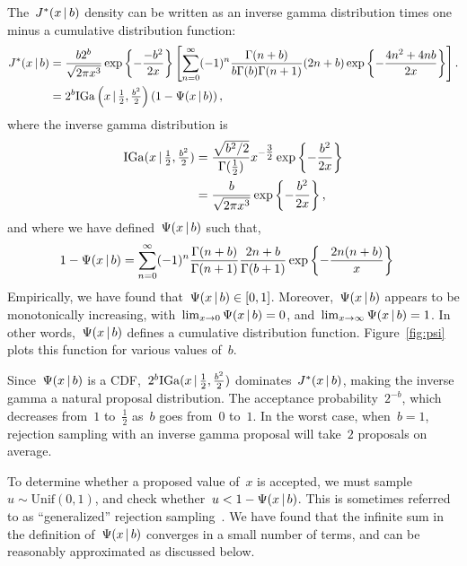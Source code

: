 \documentclass[aos,preprint]{imsart}
\renewcommand{\cite}[1]{\citep{#1}}
\begin{document}
The~$J^{*}(x \,|\, b)$ density can be written as an inverse 
gamma distribution times one minus a cumulative distribution function:
\begin{align}
  \distJacobi(x \given b) &= \frac{b 2^b}{\sqrt{2\pi x^3}} 
      \exp \left \{ -\frac{-b^2}{2x} \right \}
      \left[\sum_{n=0}^\infty (-1)^n \frac{\Gamma(n+b)}{b \Gamma(b) \Gamma(n+1)} (2n+b)
            \exp\left\{- \frac{4n^2 +4nb}{2x} \right\} \right]. \\
  &= 2^b \distInvGamma \left(x \given \tfrac{1}{2}, \tfrac{b^2}{2} \right) \left( 1 - \Psi(x \given b) \right),
\end{align}
where the inverse gamma distribution is
\begin{align}
  \distInvGamma(x \given \tfrac{1}{2}, \tfrac{b^2}{2})
  &= \frac{\sqrt{b^2/2}}{\Gamma(\tfrac{1}{2})} x^{-\tfrac{3}{2}} \exp\left\{-\frac{b^2}{2x} \right\} \\
  &= \frac{b}{\sqrt{2 \pi x^3}} \exp\left\{-\frac{b^2}{2x} \right\},
\end{align}
and where we have defined~$\Psi(x \,|\, b)$ such that,
\begin{align}
1-\Psi(x \given b) &=
    \sum_{n=0}^\infty (-1)^n \frac{\Gamma(n+b)}{\Gamma(n+1)} \frac{2n+b}{\Gamma(b+1)}
    \exp\left\{- \frac{2n(n+b)}{x} \right\}  
\end{align}
Empirically, we have found that~$\Psi(x \,|\, b) \in [0,1]$. Moreover,~$\Psi(x \,|\, b)$ appears to be monotonically increasing, with~$\lim_{x \to 0} \Psi(x \,|\, b) = 0$, and~$\lim_{x \to \infty} \Psi(x \,|\, b) = 1$. In other words,~$\Psi(x \,|\, b)$ defines a cumulative distribution function. Figure~\ref{fig:psi} plots this function for various values of~$b$. 

Since~$\Psi(x \,|\, b)$ is a
CDF,~$2^b \mathrm{IGa}(x \,|\, \tfrac{1}{2}, \tfrac{b^2}{2})$
dominates~$J^{*}(x \,|\, b)$, making the inverse gamma a
natural proposal distribution.  The acceptance probability~$2^{-b}$,
which decreases from~$1$ to~$\tfrac{1}{2}$ as~$b$ goes from~$0$
to~$1$. In the worst case, when~$b=1$, rejection sampling with an
inverse gamma proposal will take~$2$ proposals on average.

To determine whether a proposed value of~$x$ is accepted, we must
sample~$u \sim \mathrm{Unif}(0,1)$, and check
whether~$u < 1-\Psi(x \,|\, b)$. This is sometimes referred to as
``generalized'' rejection sampling~\cite{devroye1986}.
We have found that the infinite sum
in the definition of~$\Psi(x \,|\, b)$ converges in a small number of
terms, and can be reasonably approximated as discussed below. 
\end{document}

